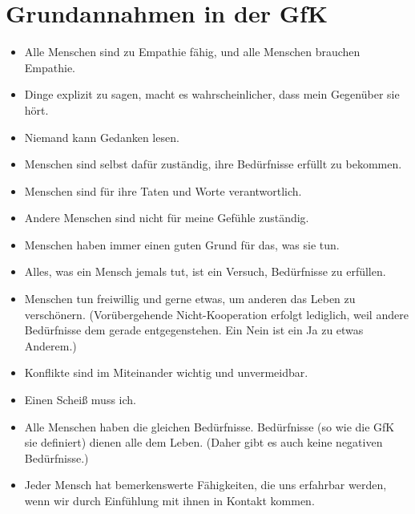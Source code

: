 \section{Grundannahmen in der GfK}
\label{gfk-annahmen}

\begin{itemize}
  \item Alle Menschen sind zu Empathie fähig, und alle Menschen brauchen Empathie.
  \item Dinge explizit zu sagen, macht es wahrscheinlicher, dass mein Gegenüber sie hört.
  \item Niemand kann Gedanken lesen.
  \item Menschen sind selbst dafür zuständig, ihre Bedürfnisse erfüllt zu bekommen.
  \item Menschen sind für ihre Taten und Worte verantwortlich.
  \item Andere Menschen sind nicht für meine Gefühle zuständig.
  \item Menschen haben immer einen guten Grund für das, was sie tun.
  \item Alles, was ein Mensch jemals tut, ist ein Versuch, Bedürfnisse zu erfüllen.
  \item Menschen tun freiwillig und gerne etwas, um anderen das Leben zu verschönern. (Vorübergehende Nicht-Kooperation erfolgt lediglich, weil andere Bedürfnisse dem gerade entgegenstehen. \glqq Ein Nein ist ein Ja zu etwas Anderem.\glqq)
  \item Konflikte sind im Miteinander wichtig und unvermeidbar.
  \item Einen Scheiß muss ich.
  \item Alle Menschen haben die gleichen Bedürfnisse. Bedürfnisse (so wie die GfK sie definiert) dienen alle dem Leben. (Daher gibt es auch keine negativen Bedürfnisse.)
  \item Jeder Mensch hat bemerkenswerte Fähigkeiten, die uns erfahrbar werden, wenn wir durch Einfühlung mit ihnen in Kontakt kommen.
\end{itemize}
